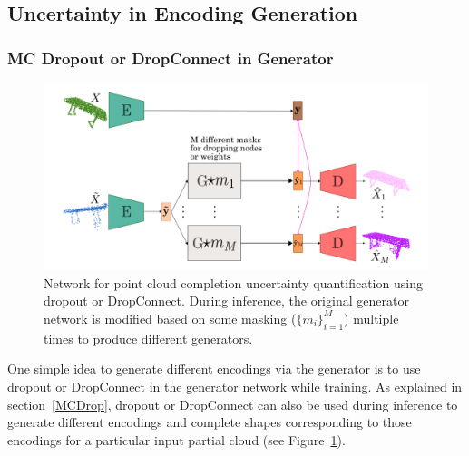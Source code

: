     
    \subsection{Uncertainty in Encoding Generation}
        \subsubsection{MC Dropout or DropConnect in Generator}
        \begin{figure}[htb]
          \begin{center}
          \includegraphics[width=\linewidth]{figures/drop_network.png}
          \end{center}
      \caption{Network for point cloud completion uncertainty quantification using dropout or DropConnect. During inference, the original generator network is modified based on some masking ($\{m_i\}_{i=1}^M$) multiple times to produce different generators.}\label{fig:drop_net}
        \end{figure}
        One simple idea to generate different encodings via the generator is to use dropout or DropConnect in the generator network while training. As explained in section~\ref{MCDrop}, dropout or DropConnect can also be used during inference to generate different encodings and complete shapes corresponding to those encodings for a particular input partial cloud (see Figure~\ref{fig:drop_net}). 
        
